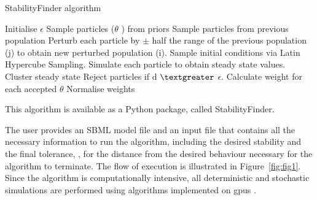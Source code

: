 {\begin{algorithm}[H]
\label{alg:StabilityFinder}
\caption{StabilityFinder algorithm}
 \begin{algorithmic}[1]
    \Statex
	\State Initialise $\epsilon$ 
		\State Sample particles ($\theta$ ) from priors
		\Else
			\State Sample particles from previous population
			\State Perturb each particle by $\pm$ half the range of the previous population (j) to obtain new perturbed population (i).
	\EndIf
	\State Sample initial conditions via Latin Hypercube Sampling.
    \State Simulate each particle to obtain steady state values.
    \State Cluster steady state
	\State Reject particles if d $\textgreater$ $\epsilon$.
    \State Calculate weight for each accepted $\theta$
	\State Normalise weights
	 
  \end{algorithmic} 
\end{algorithm}

\noindent This algorithm is available as a Python package, called StabilityFinder. %

The user provides an SBML model file \autocite{XXX} and an input file that contains all the necessary information to run the algorithm, including the desired stability and the final tolerance, \textepsilon, for the distance from the desired behaviour necessary for the algorithm to terminate. The flow of execution is illustrated in Figure~\ref{fig:fig1}. Since the algorithm is computationally intensive, all deterministic and stochastic simulations are performed using algorithms implemented on \acrfull{gpu}s \autocite{XXX}.

}
